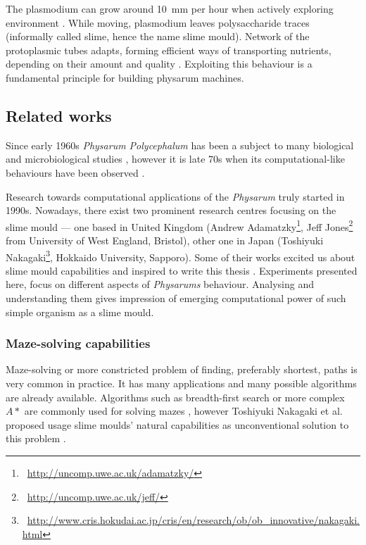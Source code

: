 The plasmodium can grow around 10~mm per hour when actively exploring environment \cite{coggin1996dynamic}. While moving, plasmodium leaves polysaccharide traces (informally called slime, hence the name slime mould). Network of the protoplasmic tubes adapts, forming efficient ways of transporting nutrients, depending on their amount and quality \cite{nakagaki2004obtaining}. Exploiting this behaviour is a fundamental principle for building physarum machines.


\subsection{Related works}

Since early 1960s \textit{Physarum Polycephalum} has been a subject to many biological and microbiological studies \cite{guttes1964mitotic,daniel1962method}, however it is late 70s when its computational-like behaviours have been observed \cite{wohlfarth1979oscillatory}.

Research towards computational applications of the \textit{Physarum} truly started in 1990s. Nowadays, there exist two prominent research centres focusing on the slime mould --- one based in United Kingdom (Andrew Adamatzky\footnote{~\url{http://uncomp.uwe.ac.uk/adamatzky/}}, Jeff Jones\footnote{~\url{http://uncomp.uwe.ac.uk/jeff/}} from University of West England, Bristol), other one in Japan (Toshiyuki Nakagaki\footnote{~\url{http://www.cris.hokudai.ac.jp/cris/en/research/ob/ob\_innovative/nakagaki.html}}, Hokkaido University, Sapporo). Some of their works excited us about slime mould capabilities and inspired to write this thesis \cite{nakagaki2000intelligence,adamatzky2010physarum,jones2015pattern,adamatzky2007physarum}. Experiments presented here, focus on different aspects of \textit{Physarums} behaviour. Analysing and understanding them gives impression of emerging computational power of such simple organism as a slime mould.


\subsubsection{Maze-solving capabilities}

Maze-solving or more constricted problem of finding, preferably shortest, paths is very common in practice. It has many applications and many possible algorithms are already available. Algorithms such as breadth-first search or more complex $A*$ are commonly used for solving mazes \cite{zelkowitz1979principles}, however Toshiyuki Nakagaki et al. proposed usage slime moulds' natural capabilities as unconventional solution to this problem \cite{nakagaki2000intelligence}.

